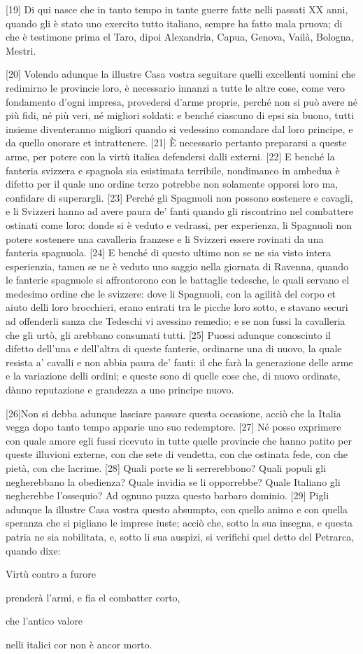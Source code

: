 {[}19{]} Di qui nasce che in tanto tempo in tante guerre fatte nelli passati XX anni, quando gli è stato uno exercito tutto italiano, sempre ha fatto mala pruova; di che è testimone prima el Taro, dipoi Alexandria, Capua, Genova, Vailà, Bologna, Mestri.


{[}20{]}  Volendo adunque la illustre Casa vostra seguitare quelli excellenti
uomini che redimirno le provincie loro, è necessario innanzi a tutte
le altre cose, come vero fondamento d'ogni impresa, provedersi d'arme
proprie, perché non si può avere né più fidi, né più veri, né migliori
soldati: e benché ciascuno di epsi sia buono, tutti insieme
diventeranno migliori quando si vedessino comandare dal loro principe,
e da quello onorare et intrattenere. {[}21{]} È necessario pertanto
prepararsi a queste arme, per potere con la virtù italica defendersi
dalli externi. {[}22{]} E benché la fanteria svizzera e spagnola sia
esistimata terribile, nondimanco in ambedua è difetto per il quale uno
ordine terzo potrebbe non solamente opporsi loro ma, confidare di
superargli. {[}23{]} Perché gli Spagnuoli non possono sostenere e
cavagli, e li Svizzeri hanno ad avere paura de' fanti quando gli
riscontrino nel combattere ostinati come loro: donde si è veduto e
vedrassi, per experienza, li Spagnuoli non potere sostenere una
cavalleria franzese e li Svizzeri essere rovinati da una fanteria
spagnuola. {[}24{]} E benché di questo ultimo non se ne sia visto
intera esperienzia, tamen se ne è veduto uno saggio nella giornata di
Ravenna, quando le fanterie spagnuole si affrontorono con le battaglie
tedesche, le quali servano el medesimo ordine che le svizzere: dove li
Spagnuoli, con la agilità del corpo et aiuto delli loro brocchieri,
erano entrati tra le picche loro sotto, e stavano securi ad offenderli
sanza che Tedeschi vi avessino remedio; e se non fussi la cavalleria
che gli urtò, gli arebbano consumati tutti. {[}25{]} Puossi adunque
conosciuto il difetto dell'una e dell'altra di queste fanterie,
ordinarne una di nuovo, la quale resista a' cavalli e non abbia paura
de' fanti: il che farà la generazione delle arme e la variazione delli
ordini; e queste sono di quelle cose che, di nuovo ordinate, dànno
reputazione e grandezza a uno principe nuovo.


{[}26{]}Non si debba adunque lasciare passare questa occasione, acciò
che la Italia vegga dopo tanto tempo apparie uno suo redemptore.
{[}27{]} Né posso exprimere con quale amore egli fussi ricevuto in tutte
quelle provincie che hanno patito per queste illuvioni externe, con che
sete di vendetta, con che ostinata fede, con che pietà, con che lacrime.
{[}28{]} Quali porte se li serrerebbono? Quali populi gli negherebbano
la obedienza? Quale invidia se li opporrebbe? Quale Italiano gli
negherebbe l'ossequio? Ad ognuno puzza questo barbaro dominio. {[}29{]}
Pigli adunque la illustre Casa vostra questo absumpto, con quello animo
e con quella speranza che si pigliano le imprese iuste; acciò che, sotto
la sua insegna, e questa patria ne sia nobilitata, e, sotto li sua
auspizi, si verifichi quel detto del Petrarca, quando dixe:

Virtù contro a furore

prenderà l'armi, e fia el combatter corto,

che l'antico valore

nelli italici cor non è ancor morto.
